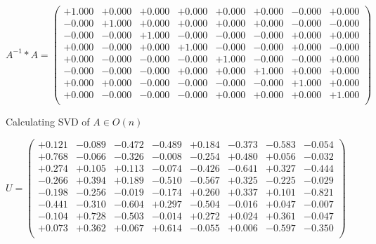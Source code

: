 \documentclass[9pt]{article}
\theoremstyle{plain}
\theoremstyle{definition}
\theoremstyle{remark}
\numberwithin{equation}{section}
\begin{document}
$A^{-1} *A = \left(
\begin{array}{
cccccccc}
+1.000 & +0.000 & +0.000 & +0.000 & +0.000 & +0.000 & -0.000 & +0.000 \\
-0.000 & +1.000 & +0.000 & +0.000 & +0.000 & +0.000 & -0.000 & -0.000 \\
-0.000 & -0.000 & +1.000 & -0.000 & -0.000 & -0.000 & +0.000 & +0.000 \\
+0.000 & -0.000 & +0.000 & +1.000 & -0.000 & -0.000 & +0.000 & -0.000 \\
+0.000 & -0.000 & -0.000 & -0.000 & +1.000 & -0.000 & -0.000 & +0.000 \\
-0.000 & -0.000 & -0.000 & +0.000 & +0.000 & +1.000 & +0.000 & +0.000 \\
+0.000 & +0.000 & -0.000 & -0.000 & -0.000 & -0.000 & +1.000 & +0.000 \\
+0.000 & -0.000 & -0.000 & -0.000 & +0.000 & +0.000 & +0.000 & +1.000 \\
\end{array}
\right)$ \newline 

Calculating SVD of  $A \in O(n)$

$U = \left(
\begin{array}{
cccccccc}
+0.121 & -0.089 & -0.472 & -0.489 & +0.184 & -0.373 & -0.583 & -0.054 \\
+0.768 & -0.066 & -0.326 & -0.008 & -0.254 & +0.480 & +0.056 & -0.032 \\
+0.274 & +0.105 & +0.113 & -0.074 & -0.426 & -0.641 & +0.327 & -0.444 \\
-0.266 & +0.394 & +0.189 & -0.510 & -0.567 & +0.325 & -0.225 & -0.029 \\
-0.198 & -0.256 & -0.019 & -0.174 & +0.260 & +0.337 & +0.101 & -0.821 \\
-0.441 & -0.310 & -0.604 & +0.297 & -0.504 & -0.016 & +0.047 & -0.007 \\
-0.104 & +0.728 & -0.503 & -0.014 & +0.272 & +0.024 & +0.361 & -0.047 \\
+0.073 & +0.362 & +0.067 & +0.614 & -0.055 & +0.006 & -0.597 & -0.350 \\
\end{array}
\right)$ \newline 
\end{document}
